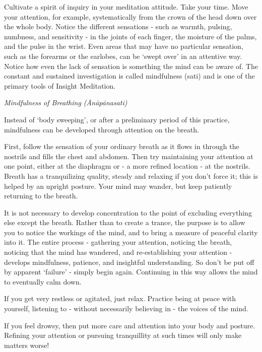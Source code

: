 Cultivate a spirit of inquiry in your meditation attitude. Take your
time. Move your attention, for example, systematically from the crown of
the head down over the whole body. Notice the different sensations -
such as warmth, pulsing, numbness, and sensitivity - in the joints of
each finger, the moisture of the palms, and the pulse in the wrist. Even
areas that may have no particular sensation, such as the forearms or the
earlobes, can be `swept over' in an attentive way. Notice how even the
lack of sensation is something the mind can be aware of. The constant
and sustained investigation is called mindfulness (sati) and is one of
the primary tools of Insight Meditation.

\newpage

\emph{Mindfulness of Breathing (Ānāpānasati)}

Instead of `body sweeping', or after a preliminary period of this
practice, mindfulness can be developed through attention on the breath.

First, follow the sensation of your ordinary breath as it flows in
through the nostrils and fills the chest and abdomen. Then try
maintaining your attention at one point, either at the diaphragm or - a
more refined location - at the nostrils. Breath has a tranquilizing
quality, steady and relaxing if you don't force it; this is helped by an
upright posture. Your mind may wander, but keep patiently returning to
the breath.

It is not necessary to develop concentration to the point of excluding
everything else except the breath. Rather than to create a trance, the
purpose is to allow you to notice the workings of the mind, and to bring
a measure of peaceful clarity into it. The entire process - gathering
your attention, noticing the breath, noticing that the mind has
wandered, and re-establishing your attention - develops mindfulness,
patience, and insightful understanding. So don't be put off by apparent
`failure' - simply begin again. Continuing in this way allows the mind
to eventually calm down.

If you get very restless or agitated, just relax. Practice being at
peace with yourself, listening to - without necessarily believing in -
the voices of the mind.

If you feel drowsy, then put more care and attention into your body and
posture. Refining your attention or pursuing tranquillity at such times
will only make matters worse!

